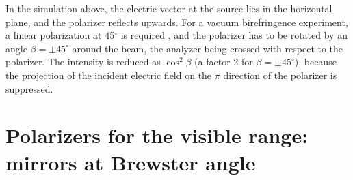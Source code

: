 \documentclass{iucr}
\begin{document}
In the simulation above, the electric vector at the source lies in the horizontal plane, and the polarizer reflects upwards.
For a vacuum birefringence experiment, a linear polarization at 45$^\circ$ is required \cite{Shen2018}, and the polarizer has to be rotated by an angle $\beta=\pm45^\circ$ around the beam, the analyzer being crossed with respect to the polarizer.
The intensity is reduced as $\cos^2\beta$ (a factor 2 for $\beta=\pm45^\circ$), because the projection of the incident electric field on the $\pi$ direction of the polarizer is suppressed.

\section{Polarizers for the visible range: mirrors at Brewster angle}\label{sec:visible_polarizers}
\end{document}
